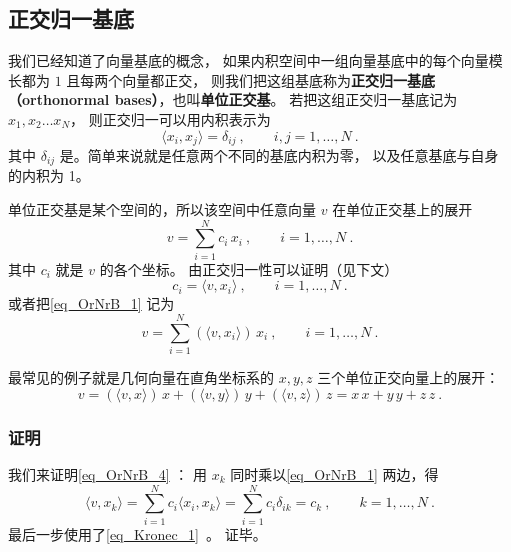 
\begin{issues}
\issueTODO
\end{issues}



\subsection{正交归一基底}

我们已经知道了向量基底的概念， 如果内积空间中一组向量基底中的每个向量模长都为 $1$ 且每两个向量都正交， 则我们把这组基底称为\textbf{正交归一基底（orthonormal bases）}，也叫\textbf{单位正交基}。 若把这组正交归一基底记为 $x_1, x_2 \dots x_N$， 则正交归一可以用内积表示为
\begin{equation}\label{eq_OrNrB_3}
\langle x_i, x_j \rangle = \delta_{ij} ~,\qquad i,j = 1,\dots, N~.
\end{equation}
其中 $\delta_{ij}$ 是。简单来说就是任意两个不同的基底内积为零， 以及任意基底与自身的内积为 1。

单位正交基是某个空间的，所以该空间中任意向量 $v$ 在单位正交基上的展开
\begin{equation}\label{eq_OrNrB_1}
v = \sum_{i = 1}^N c_i \, x_i ~,\qquad i = 1, \dots, N~.
\end{equation}
其中 $c_i$ 就是 $v$ 的各个坐标。 由正交归一性可以证明（见下文）
\begin{equation}\label{eq_OrNrB_4}
c_i = \langle v, x_i \rangle ~,\qquad i = 1, \dots, N~.
\end{equation}
或者把\autoref{eq_OrNrB_1} 记为
\begin{equation}\label{eq_OrNrB_5}
v = \sum_{i = 1}^N (\langle v, x_i \rangle) \, x_i~, \qquad i = 1, \dots, N~.
\end{equation}

最常见的例子就是几何向量在直角坐标系的 $x, y, z$ 三个单位正交向量上的展开：
\begin{equation}
v = (\langle v, x \rangle)\, x + (\langle v, y \rangle)\, y + (\langle v, z \rangle)\, z = x \, x + y \, y + z \, z~.
\end{equation} 

\subsubsection{证明}
我们来证明\autoref{eq_OrNrB_4} ： 用 $x_k$ 同时乘以\autoref{eq_OrNrB_1} 两边，得
\begin{equation}\label{eq_OrNrB_2}
\langle v, x_k \rangle = \sum_{i = 1}^N c_i \langle x_i, x_k \rangle = \sum_{i = 1}^N c_i \delta_{ik} = c_k ~,\qquad k = 1, \dots, N~.
\end{equation}
最后一步使用了\autoref{eq_Kronec_1}~。 证毕。

